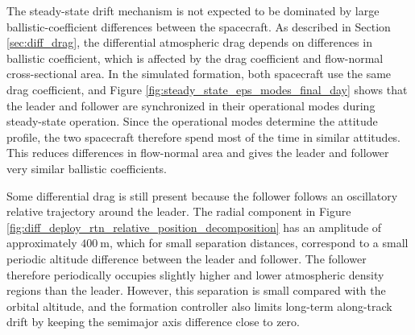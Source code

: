 The steady-state drift mechanism is not expected to be dominated by large ballistic-coefficient differences between the spacecraft. As described in Section \ref{sec:diff_drag}, the differential atmospheric drag depends on differences in ballistic coefficient, which is affected by the drag coefficient and flow-normal cross-sectional area. In the simulated formation, both spacecraft use the same drag coefficient, and Figure \ref{fig:steady_state_eps_modes_final_day} shows that the leader and follower are synchronized in their operational modes during steady-state operation. Since the operational modes determine the attitude profile, the two spacecraft therefore spend most of the time in similar attitudes. This reduces differences in flow-normal area and gives the leader and follower very similar ballistic coefficients.

Some differential drag is still present because the follower follows an oscillatory relative trajectory around the leader. The radial component in Figure \ref{fig:diff_deploy_rtn_relative_position_decomposition} has an amplitude of approximately $400~\mathrm{m}$, which for small separation distances, correspond to a small periodic altitude difference between the leader and follower. The follower therefore periodically occupies slightly higher and lower atmospheric density regions than the leader. However, this separation is small compared with the orbital altitude, and the formation controller also limits long-term along-track drift by keeping the semimajor axis difference close to zero.

